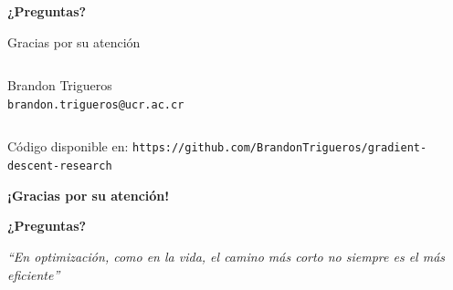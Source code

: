 \documentclass[10pt]{beamer}
\begin{document}
\begin{frame}[plain]
\begin{center}
{\Huge \textbf{¿Preguntas?}}

\vspace{1.5cm}

{\Large Gracias por su atención}

\vspace{1cm}

\begin{columns}
\begin{column}{0.5\textwidth}
\centering
Brandon Trigueros\\
\texttt{brandon.trigueros@ucr.ac.cr}
\end{column}
\end{columns}

\vspace{1cm}

{\small Código disponible en: \texttt{https://github.com/BrandonTrigueros/gradient-descent-research}}
\end{center}
\end{frame}

\begin{frame}
\begin{center}
\Large \textbf{¡Gracias por su atención!}

\vspace{1cm}

\textcolor{azulUni}{\huge \textbf{¿Preguntas?}}

\vspace{1cm}


\vspace{0.5cm}

\textit{``En optimización, como en la vida, el camino más corto no siempre es el más eficiente''}

\end{center}
\end{frame}
\end{document}
